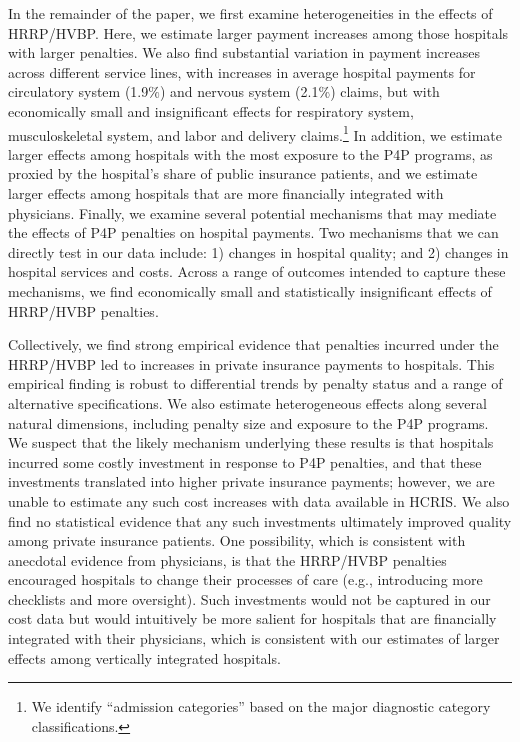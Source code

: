 \documentclass[12pt]{article}
\begin{document}
In the remainder of the paper, we first examine heterogeneities in the effects of HRRP/HVBP. Here, we estimate larger payment increases among those hospitals with larger penalties. We also find substantial variation in payment increases across different service lines, with increases in average hospital payments for circulatory system (1.9$\%$) and nervous system (2.1$\%$) claims, but with economically small and insignificant effects for respiratory system, musculoskeletal system, and labor and delivery claims.\footnote{We identify ``admission categories'' based on the major diagnostic category classifications.} In addition, we estimate larger effects among hospitals with the most exposure to the P4P programs, as proxied by the hospital's share of public insurance patients, and we estimate larger effects among hospitals that are more financially integrated with physicians. Finally, we examine several potential mechanisms that may mediate the effects of P4P penalties on hospital payments. Two mechanisms that we can directly test in our data include: 1) changes in hospital quality; and 2) changes in hospital services and costs. Across a range of outcomes intended to capture these mechanisms, we find economically small and statistically insignificant effects of HRRP/HVBP penalties.

Collectively, we find strong empirical evidence that penalties incurred under the HRRP/HVBP led to increases in private insurance payments to hospitals. This empirical finding is robust to differential trends by penalty status and a range of alternative specifications. We also estimate heterogeneous effects along several natural dimensions, including penalty size and exposure to the P4P programs. We suspect that the likely mechanism underlying these results is that hospitals incurred some costly investment in response to P4P penalties, and that these investments translated into higher private insurance payments; however, we are unable to estimate any such cost increases with data available in HCRIS. We also find no statistical evidence that any such investments ultimately improved quality among private insurance patients. One possibility, which is consistent with anecdotal evidence from physicians, is that the HRRP/HVBP penalties encouraged hospitals to change their processes of care (e.g., introducing more checklists and more oversight). Such investments would not be captured in our cost data but would intuitively be more salient for hospitals that are financially integrated with their physicians, which is consistent with our estimates of larger effects among vertically integrated hospitals.
\end{document}
